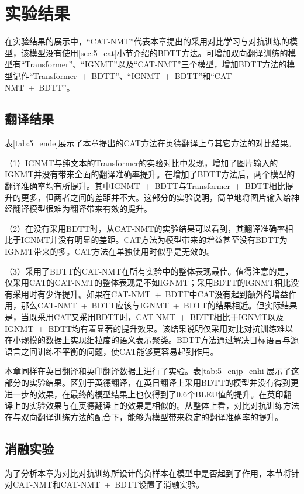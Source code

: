 \section{实验结果}

在实验结果的展示中，“CAT-NMT”代表本章提出的采用对比学习与对抗训练的模型，该模型没有使用\ref{sec:5_cat}小节介绍的BDTT方法。可增加双向翻译训练的模型有“Transformer”、“IGNMT”以及“CAT-NMT”三个模型，增加BDTT方法的模型记作“Transformer~+~BDTT”、“IGNMT~+~BDTT”和“CAT-NMT~+~BDTT”。

\subsection{翻译结果}
\label{sec:5_translation_results}

表\ref{tab:5_ende}展示了本章提出的CAT方法在英德翻译上与其它方法的对比结果。

（1）IGNMT与纯文本的Transformer的实验对比中发现，增加了图片输入的IGNMT并没有带来全面的翻译准确率提升。在增加了BDTT方法后，两个模型的翻译准确率均有所提升。其中IGNMT~+~BDTT与Transformer~+~BDTT相比提升的更多，但两者之间的差距并不大。这部分的实验说明，简单地将图片输入给神经翻译模型很难为翻译带来有效的提升。

（2）在没有采用BDTT时，从CAT-NMT的实验结果可以看到，其翻译准确率相比于IGNMT并没有明显的差距。CAT方法为模型带来的增益甚至没有BDTT为IGNMT带来的多。CAT方法在单独使用时似乎是无效的。

（3）采用了BDTT的CAT-NMT在所有实验中的整体表现最佳。值得注意的是，仅采用CAT的CAT-NMT的整体表现是不如IGNMT；采用BDTT的IGNMT相比没有采用时有少许提升。如果在CAT-NMT~+~BDTT中CAT没有起到额外的增益作用，那么CAT-NMT~+~BDTT应该与IGNMT~+~BDTT的结果相近。但实际结果是，当既采用CAT又采用BDTT时，CAT-NMT~+~BDTT相比于IGNMT以及IGNMT~+~BDTT均有着显著的提升效果。该结果说明仅采用对比对抗训练难以在小规模的数据上实现细粒度的语义表示聚类。BDTT方法通过解决目标语言与源语言之间训练不平衡的问题，使CAT能够更容易起到作用。


本章同样在英日翻译和英印翻译数据上进行了实验。表\ref{tab:5_enjp_enhi}展示了这部分的实验结果。区别于英德翻译，在英日翻译上采用BDTT的模型并没有得到更进一步的效果，在最终的模型结果上也仅得到了0.6个BLEU值的提升。在英印翻译上的实验效果与在英德翻译上的效果是相似的。从整体上看，对比对抗训练方法在与双向翻译训练方法的配合下，能够为模型带来稳定的翻译准确率的提升。

\subsection{消融实验}
\label{sec:5_ablation_study}

为了分析本章为对比对抗训练所设计的负样本在模型中是否起到了作用，本节将针对CAT-NMT和CAT-NMT~+~BDTT设置了消融实验。

